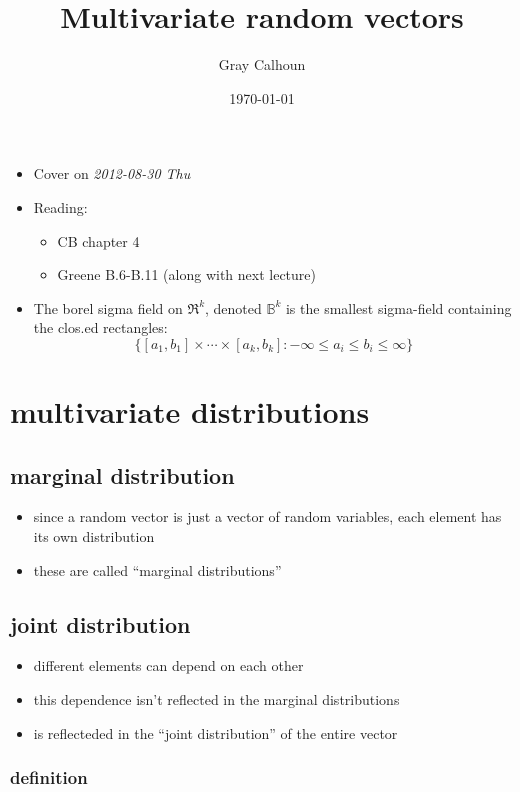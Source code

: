 \documentclass[11pt]{article}
\title{Multivariate random vectors}
\author{Gray Calhoun}
\date{\today}
\begin{document}
\maketitle

\setcounter{tocdepth}{2}
\tableofcontents
\vspace*{1cm}
\begin{itemize}
\item Cover on \textit{2012-08-30 Thu}
\item Reading:
\begin{itemize}
\item CB chapter 4
\item Greene B.6-B.11 (along with next lecture)
\end{itemize}
\item The borel sigma field on $\Re^k$, denoted $\mathbb{B}^k$ is the
     smallest sigma-field containing the clos.ed
     rectangles: \[\{[a_1,b_1] \times \cdots \times [a_k,b_k] : -
     \infty \leq a_i \leq b_i \leq \infty\}\]
\end{itemize}
\section{multivariate distributions}
\label{sec-1}
\subsection{marginal distribution}
\label{sec-1-1}

\begin{itemize}
\item since a random vector is just a vector of random variables, each
       element has its own distribution
\item these are called ``marginal distributions''
\end{itemize}
\subsection{joint distribution}
\label{sec-1-2}

\begin{itemize}
\item different elements can depend on each other
\item this dependence isn't reflected in the marginal distributions
\item is reflecteded in the ``joint distribution'' of the entire vector
\end{itemize}
\subsubsection{definition}
\label{sec-1-2-1}
\end{document}
